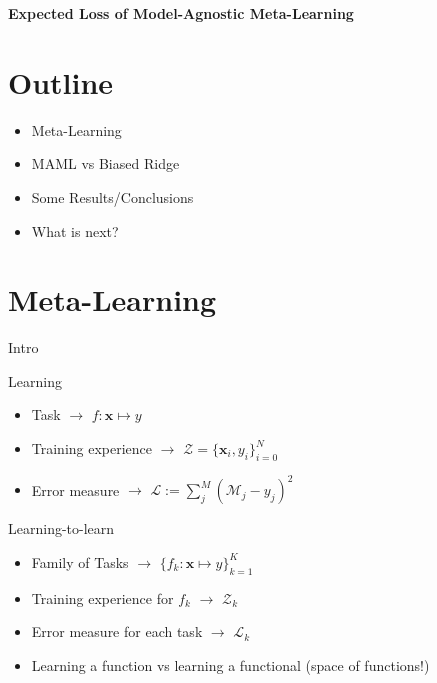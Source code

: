 \documentclass[aspectratio=169]{beamer}
\author{\authorlabel}
\newcommand{\mysubtitle}{\color{Pink}\Large{\textbf{Expected Loss of Model-Agnostic Meta-Learning}}}
\begin{document}



\begin{frame}
	\centering
	\mysubtitle
\end{frame}

\section{Outline}
\begin{frame}
  \begin{itemize}
    \item Meta-Learning
    \item MAML vs Biased Ridge
    \item Some Results/Conclusions
    \item What is next?
  \end{itemize}
\end{frame}

\section{Meta-Learning}
\begin{frame}{Intro}
\begin{minipage}{0.5\textwidth}
  \color{Pink} Learning \color{Black}
  \begin{itemize}
    \item<1> Task $\to$ $f:\mathbf{x}\mapsto y$
    \item<1> Training experience $\to$ $\mathcal{Z}=\{\mathbf{x}_i,y_i\}_{i=0}^N$
    \item<1> Error measure $\to$ $\mathcal{L}:=\sum_j^M(\mathcal{M}_j-y_j)^2$
  \end{itemize}
\end{minipage}%
\begin{minipage}{0.5\textwidth}
  \color{Pink} Learning-to-learn \color{Black}
  \begin{itemize}
    \item<2> Family of Tasks $\to$ $\{f_k:\mathbf{x}\mapsto y\}_{k=1}^{K}$
    \item<2> Training experience for $f_k$ $\to$ $\mathcal{Z}_k$
    \item<2> Error measure for each task $\to$ $\mathcal{L}_k$
  \end{itemize}
\end{minipage}
  \begin{itemize}
  \centering
    \item<3> Learning a function vs learning a functional (space of functions!)
  \end{itemize}
\end{frame}
\end{document}

